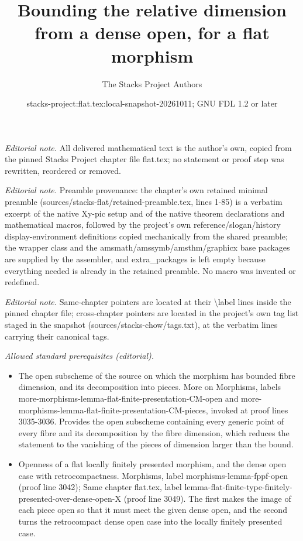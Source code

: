 \documentclass[10pt,a4paper]{amsart}
\title{Bounding the relative dimension from a dense open, for a flat morphism}
\author{The Stacks Project Authors}
\date{stacks-project:flat.tex:local-snapshot-20261011; GNU FDL 1.2 or later}
\theoremstyle{plain}
\theoremstyle{definition}
\theoremstyle{remark}
\numberwithin{equation}{subsection}
\begin{document}
\maketitle
\noindent\textit{Editorial note.} All delivered mathematical text is the author's own, copied from the pinned Stacks Project chapter file flat.tex; no statement or proof step was rewritten, reordered or removed.\par\medskip
\noindent\textit{Editorial note.} Preamble provenance: the chapter's own retained minimal preamble (sources/stacks-flat/retained-preamble.tex, lines 1-85) is a verbatim excerpt of the native Xy-pic setup and of the native theorem declarations and mathematical macros, followed by the project's own reference/slogan/history display-environment definitions copied mechanically from the shared preamble; the wrapper class and the amsmath/amssymb/amsthm/graphicx base packages are supplied by the assembler, and extra\_packages is left empty because everything needed is already in the retained preamble. No macro was invented or redefined.\par\medskip
\noindent\textit{Editorial note.} Same-chapter pointers are located at their \textbackslash{}label lines inside the pinned chapter file; cross-chapter pointers are located in the project's own tag list staged in the snapshot (sources/stacks-chow/tags.txt), at the verbatim lines carrying their canonical tags.\par\medskip
\noindent\textit{Allowed standard prerequisites (editorial).}\begin{itemize}
\item The open subscheme of the source on which the morphism has bounded fibre dimension, and its decomposition into pieces. More on Morphisms, labels more-morphisms-lemma-flat-finite-presentation-CM-open and more-morphisms-lemma-flat-finite-presentation-CM-pieces, invoked at proof lines 3035-3036. Provides the open subscheme containing every generic point of every fibre and its decomposition by the fibre dimension, which reduces the statement to the vanishing of the pieces of dimension larger than the bound.
\item Openness of a flat locally finitely presented morphism, and the dense open case with retrocompactness. Morphisms, label morphisms-lemma-fppf-open (proof line 3042); Same chapter flat.tex, label lemma-flat-finite-type-finitely-presented-over-dense-open-X (proof line 3049). The first makes the image of each piece open so that it must meet the given dense open, and the second turns the retrocompact dense open case into the locally finitely presented case.
\end{itemize}\medskip
\end{document}
